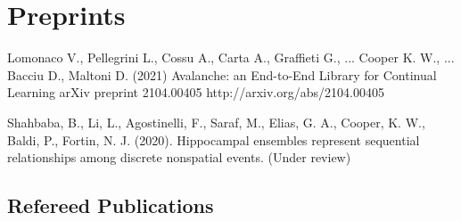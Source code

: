 \documentclass[10pt]{cooperCV2}
\begin{document}



\section{Preprints} 
\begin{etaremune}[ itemindent=-\bibhang, topsep=0pt,
				   itemsep=\bibsep,partopsep=0pt,parsep=0pt,leftmargin={\bibhang+\widthof{[999]}}] 
    \item Lomonaco V., Pellegrini L., Cossu A., Carta A., Graffieti G., ... Cooper K. W., ... Bacciu D., Maltoni D. 
 (2021) Avalanche: an End-to-End Library for Continual Learning  arXiv preprint 2104.00405 
http://arxiv.org/abs/2104.00405

    \item  Shahbaba, B., Li, L., Agostinelli, F., Saraf, M., Elias, G. A., Cooper, K. W., Baldi, P.,  Fortin, N. J. (2020). Hippocampal ensembles represent sequential relationships among discrete nonspatial events. (Under review)
\end{etaremune}


\vspace{0.1in}
\subsection{Refereed Publications}
\end{document}
